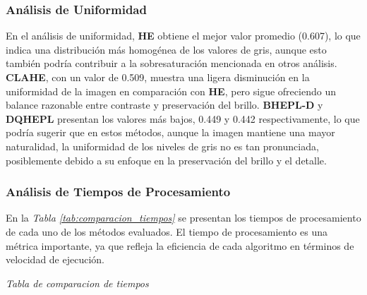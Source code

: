 \documentclass[sigchi]{acmart}
\begin{document}
\subsubsection{Análisis de Uniformidad}
\label{subsubsec:analisis_uniformidad}

En el análisis de uniformidad, \textbf{HE} obtiene el mejor valor promedio (0.607), lo que
indica una distribución más homogénea de los valores de gris, aunque esto también podría
contribuir a la sobresaturación mencionada en otros análisis. \textbf{CLAHE}, con un valor de
0.509, muestra una ligera disminución en la uniformidad de la imagen en comparación con
\textbf{HE}, pero sigue ofreciendo un balance razonable entre contraste y preservación del
brillo. \textbf{BHEPL-D} y \textbf{DQHEPL} presentan los valores más bajos, 0.449 y 0.442
respectivamente, lo que podría sugerir que en estos métodos, aunque la imagen mantiene una
mayor naturalidad, la uniformidad de los niveles de gris no es tan pronunciada, posiblemente
debido a su enfoque en la preservación del brillo y el detalle.

\subsubsection{Análisis de Tiempos de Procesamiento}
\label{subsubsec:analisis_tiempos}

En la \emph{Tabla \ref{tab:comparacion_tiempos}} se presentan los tiempos de procesamiento de cada uno
de los métodos evaluados. El tiempo de procesamiento es una métrica importante, ya que refleja
la eficiencia de cada algoritmo en términos de velocidad de ejecución.

\begin{table}[H]
	\caption{Comparación de tiempos de procesamiento}
	\label{tab:comparacion_tiempos}
	\small

	\vspace{0.5em}
	\footnotesize%
	\textit{Tabla de comparacion de tiempos}
\end{table}
\end{document}
